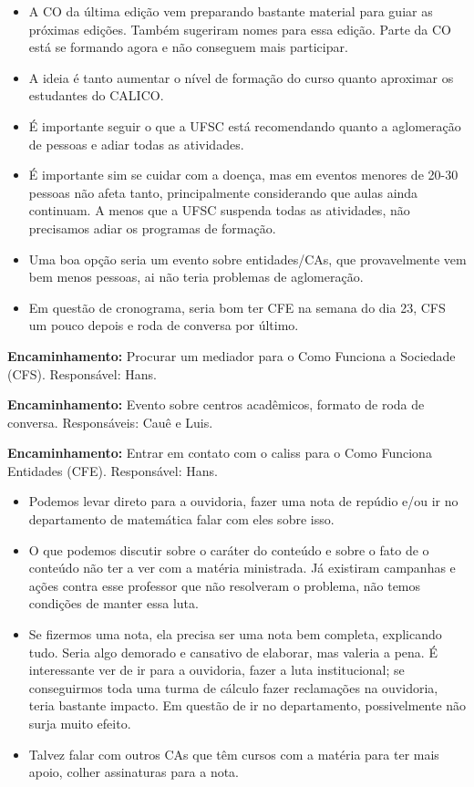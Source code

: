\documentclass{ata-calico}
\begin{document}
\begin{itemize}
\item A CO da última edição vem preparando bastante material para guiar as próximas edições. Também sugeriram nomes para essa edição. Parte da CO está se formando agora e não conseguem mais participar.
\end{itemize}

\begin{itemize}
\item A ideia é tanto aumentar o nível de formação do curso quanto aproximar os estudantes do CALICO.
\item É importante seguir o que a UFSC está recomendando quanto a aglomeração de pessoas e adiar todas as atividades.
\item É importante sim se cuidar com a doença, mas em eventos menores de 20-30 pessoas não afeta tanto, principalmente considerando que aulas ainda continuam. A menos que a UFSC suspenda todas as atividades, não precisamos adiar os programas de formação.
\item Uma boa opção seria um evento sobre entidades/CAs, que provavelmente vem bem menos pessoas, ai não teria problemas de aglomeração.
\item Em questão de cronograma, seria bom ter CFE na semana do dia 23, CFS um pouco depois e roda de conversa por último.
\end{itemize}

\textbf{Encaminhamento:} Procurar um mediador para o Como Funciona a Sociedade (CFS). Responsável: Hans.

\textbf{Encaminhamento:} Evento sobre centros acadêmicos, formato de roda de conversa. Responsáveis: Cauê e Luis.

\textbf{Encaminhamento:} Entrar em contato com o caliss para o Como Funciona Entidades (CFE). Responsável: Hans.

\begin{itemize}
\item Podemos levar direto para a ouvidoria, fazer uma nota de repúdio e/ou ir no departamento de matemática falar com eles sobre isso.
\item O que podemos discutir sobre o caráter do conteúdo e sobre o fato de o conteúdo não ter a ver com a matéria ministrada. Já existiram campanhas e ações contra esse professor que não resolveram o problema, não temos condições de manter essa luta.
\item Se fizermos uma nota, ela precisa ser uma nota bem completa, explicando tudo. Seria algo demorado e cansativo de elaborar, mas valeria a pena. É interessante ver de ir para a ouvidoria, fazer a luta institucional; se conseguirmos toda uma turma de cálculo fazer reclamações na ouvidoria, teria bastante impacto. Em questão de ir no departamento, possivelmente não surja muito efeito.
\item Talvez falar com outros CAs que têm cursos com a matéria para ter mais apoio, colher assinaturas para a nota.
\end{itemize}
\end{document}
